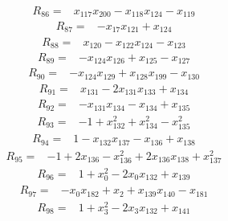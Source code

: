 {\begin{align*}
\end{align*}
\begin{align*}
R_{86} ={}& x_{117} x_{200} - x_{118} x_{124} - x_{119}
\end{align*}
\begin{align*}
R_{87} ={}& -x_{17} x_{121} + x_{124}
\end{align*}
\begin{align*}
R_{88} ={}& x_{120} - x_{122} x_{124} - x_{123}
\end{align*}
\begin{align*}
R_{89} ={}& -x_{124} x_{126} + x_{125} - x_{127}
\end{align*}
\begin{align*}
R_{90} ={}& -x_{124} x_{129} + x_{128} x_{199} - x_{130}
\end{align*}
\begin{align*}
R_{91} ={}& x_{131} - 2x_{131} x_{133} + x_{134}
\end{align*}
\begin{align*}
R_{92} ={}& -x_{131} x_{134} - x_{134} + x_{135}
\end{align*}
\begin{align*}
R_{93} ={}& -1 + x_{132}^{2} + x_{134}^{2} - x_{135}^{2}
\end{align*}
\begin{align*}
R_{94} ={}& 1 - x_{132} x_{137} - x_{136} + x_{138}
\end{align*}
\begin{align*}
R_{95} ={}& -1 + 2x_{136} - x_{136}^{2} + 2x_{136} x_{138} + x_{137}^{2}
\end{align*}
\begin{align*}
R_{96} ={}& 1 + x_{0}^{2} - 2x_{0} x_{132} + x_{139}
\end{align*}
\begin{align*}
R_{97} ={}& -x_{0} x_{182} + x_{2} + x_{139} x_{140} - x_{181}
\end{align*}
\begin{align*}
R_{98} ={}& 1 + x_{3}^{2} - 2x_{3} x_{132} + x_{141}
\end{align*}
}
